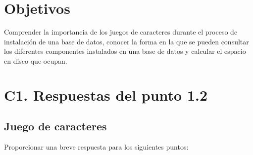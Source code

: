 \documentclass{article}
\begin{document}
\section*{Objetivos}
Comprender la importancia de los juegos de caracteres durante el proceso de 
instalación de una base de datos, conocer la forma en la que se pueden consultar 
los diferentes componentes instalados en una base de datos y calcular el 
espacio en disco que ocupan.

\section*{C1. Respuestas del punto 1.2}
\subsection*{Juego de caracteres}
Proporcionar una breve respuesta para los siguientes puntos:
\end{document}
